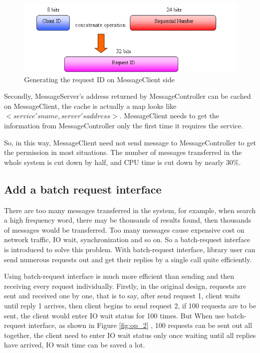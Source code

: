 \documentclass[a4paper,10pt]{article}
\begin{document}
\begin{figure}[!ht]\centering
  \includegraphics[width=.55 \textwidth]{ID_1.png}
  \caption{Generating the request ID on MessageClient side}\label{fig:request_ID}
\end{figure}

Secondly, MessageServer's address returned by MessageController can be cached on MessageClient, the cache is actually a map looks like $<service's name, server's address>$.
MessageClient needs to get the information from MessageController only the first time it requires the service.

So, in this way, MessageClient need not send message to MessageController to get the permission in most situations.
The number of messages transferred in the whole system is cut down by half, and CPU time is cut down by nearly 30\%.

\subsection{Add a batch request interface}
There are too many messages transferred in the system, for example, when search a high frequency word, there may be thousands of results found,
then thousands of messages would be transferred. Too many messages cause expensive cost on network traffic, IO wait, synchronization and so on.
So a batch-request interface is introduced to solve this problem. With batch-request interface, library user can send numerous requests out and get their replies by a single call quite efficiently.

Using batch-request interface is much more efficient than sending and then receiving every request individually.
Firstly, in the original design, requests are sent and received one by one, that is to say, after send request 1, client waits until reply 1 arrives, then client begins to send request 2,
if 100 requests are to be sent, the client would enter IO wait status for 100 times.
But When use batch-request interface, as shown in Figure \ref{fig:op_2} , 100 requests can be sent out all together, the client need to enter IO wait status only once waiting until all replies have arrived,
IO wait time can be saved a lot.
\end{document}
